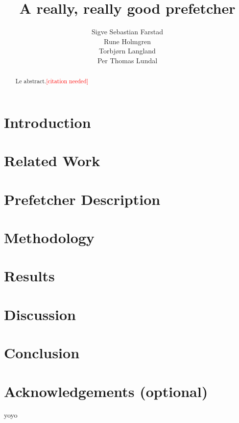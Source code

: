 \documentclass[a4paper]{IEEEtran}
\title{A really, really good prefetcher}
\author{
    Sigve Sebastian Farstad \\
    Rune Holmgren \\
    Torbjørn Langland \\
    Per Thomas Lundal \\
}
\newcommand\cn{\textcolor{red}{[citation needed]}}
\begin{document}
\maketitle

\begin{abstract}
    Le abstract.\cn
\end{abstract}

\section{Introduction}
\section{Related Work}
\section{Prefetcher Description}
\section{Methodology}
\section{Results}
\section{Discussion}
\section{Conclusion}
\section{Acknowledgements (optional)}

yoyo \cite{assignment-text}



\nocite{*}
\end{document}
